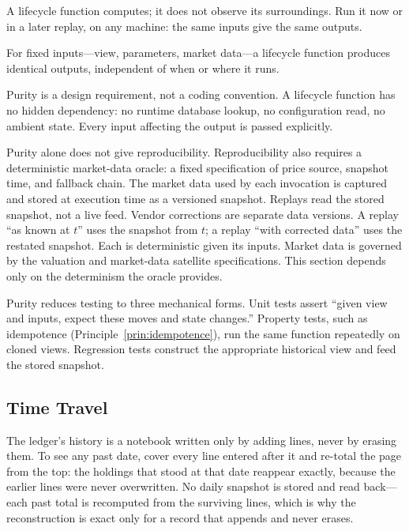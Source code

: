 A lifecycle function computes; it does not observe its surroundings. Run it now or in a later replay, on any machine: the same inputs give the same outputs.

\begin{principle}[Purity]
\label{prin:purity}
For fixed inputs---view, parameters, market data---a lifecycle function produces identical outputs, independent of when or where it runs.
\end{principle}

Purity is a design requirement, not a coding convention. A lifecycle function has no hidden dependency: no runtime database lookup, no configuration read, no ambient state. Every input affecting the output is passed explicitly.

Purity alone does not give reproducibility. Reproducibility also requires a deterministic market-data oracle: a fixed specification of price source, snapshot time, and fallback chain. The market data used by each invocation is captured and stored at execution time as a versioned snapshot. Replays read the stored snapshot, not a live feed. Vendor corrections are separate data versions. A replay ``as known at $t$'' uses the snapshot from $t$; a replay ``with corrected data'' uses the restated snapshot. Each is deterministic given its inputs. Market data is governed by the valuation and market-data satellite specifications. This section depends only on the determinism the oracle provides.

Purity reduces testing to three mechanical forms. Unit tests assert ``given view and inputs, expect these moves and state changes.'' Property tests, such as idempotence (Principle~\ref{prin:idempotence}), run the same function repeatedly on cloned views. Regression tests construct the appropriate historical view and feed the stored snapshot.

\subsection{Time Travel}

\begin{mentalmodel}
The ledger's history is a notebook written only by adding lines, never by erasing them. To see any past date, cover every line entered after it and re-total the page from the top: the holdings that stood at that date reappear exactly, because the earlier lines were never overwritten. No daily snapshot is stored and read back---each past total is recomputed from the surviving lines, which is why the reconstruction is exact only for a record that appends and never erases.
\end{mentalmodel}

